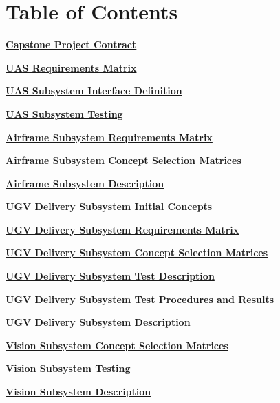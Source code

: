 \documentclass[]{article}
\newcounter{includepdfpage}
\newcommand{\pdflink}[2]{
\hyperlink{#1.1}{\textbf{#2}}
}
\newcommand{\pdflinkdoc}[2]{

}
\begin{document}



\section*{Table of Contents}

\pdflink{proj_cont}{Capstone Project Contract}

\pdflink{req_mat}{UAS Requirements Matrix}


\pdflink{ss_def}{UAS Subsystem Interface Definition}

\pdflink{ss_test}{UAS Subsystem Testing}


\pdflink{af_reqmat}{Airframe Subsystem Requirements Matrix}

\pdflink{af_select}{Airframe Subsystem Concept Selection Matrices}

\pdflink{af_def}{Airframe Subsystem Description}


\pdflink{ugv_init}{UGV Delivery Subsystem Initial Concepts}

\pdflink{ugv_reqmat}{UGV Delivery Subsystem Requirements Matrix}

\pdflink{ugv_select}{UGV Delivery Subsystem Concept Selection Matrices}

\pdflink{ugv_test}{UGV Delivery Subsystem Test Description}

\pdflink{ugv_proc}{UGV Delivery Subsystem Test Procedures and Results}

\pdflink{ugv_def}{UGV Delivery Subsystem Description}


\pdflink{vis_select}{Vision Subsystem Concept Selection Matrices}

\pdflink{vis_test}{Vision Subsystem Testing}

\pdflink{vis_def}{Vision Subsystem Description}


\pdflinkdoc{proj_cont}{./../ProjectContract/Capstone Team 45 Project Contract.pdf}
\pdflinkdoc{req_mat}{./../OpportunityDevelopment/RequirementMatrix/requirements_matrix.pdf}

\pdflinkdoc{ss_def}{./SubsystemInterfaces/SubsystemInterfacesDescription/SubsystemInterfaceDefinitions.pdf}
\pdflinkdoc{ss_test}{./SubsystemInterfaces/SITestProceduresAndResults/SITestProceduresAndResults.pdf}

\pdflinkdoc{af_reqmat}{./Airframe/AirframeRequirementsMatrix/AirframeRequirementsMatrix.pdf}
\pdflinkdoc{af_select}{./Airframe/AirframeConceptSelectionMatrices/AirframeConceptSelectionMatrices.pdf}
\pdflinkdoc{af_def}{./Airframe/AirframeDescription/AirframeDescription.pdf}
\end{document}
